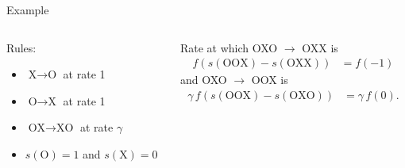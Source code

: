 \documentclass[smaller]{beamer}
\begin{document}
\begin{frame}{Example}

  \begin{columns}[c]
    \begin{column}{.5\textwidth}
  Rules:
  \begin{itemize}
    \item $\text{X} \to \text{O}$ at rate 1
    \item $\text{O} \to \text{X}$ at rate 1
    \item $\text{OX} \to \text{XO}$ at rate $\gamma$
    \item $s(\text{O}) = 1$ and $s(\text{X}) = 0$
  \end{itemize}

    \end{column}
    \begin{column}{.5\textwidth}

      Rate at which OXO $\to$ OXX is
      \begin{align*}
      f( s(\text{OOX}) - s(\text{OXX}) ) &= f( -1 ) 
      \end{align*}
      and OXO $\to$ OOX is
      \begin{align*}
      \gamma \, f( s(\text{OOX}) - s(\text{OXO}) ) &= \gamma \, f( 0 ) .
      \end{align*}

    \end{column}
  \end{columns}


\end{frame}
\end{document}
